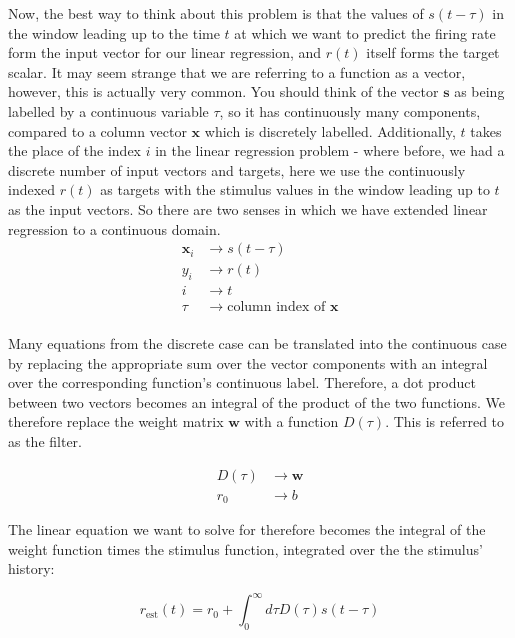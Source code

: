 \documentclass{article}
\begin{document}
Now, the best way to think about this problem is that the values of $s(t-\tau)$ in the window leading up to the time $t$ at which we want to predict the firing rate form the input vector for our linear regression, and $r(t)$ itself forms the target scalar. It may seem strange that we are referring to a function as a vector, however, this is actually very common. You should think of the vector $\bm{s}$ as being labelled by a continuous variable $\tau$, so it has continuously many components, compared to a column vector $\bm{x}$ which is discretely labelled. Additionally, $t$ takes the place of the index $i$ in the linear regression problem - where before, we had a discrete number of input vectors and targets, here we use the continuously indexed $r(t)$ as targets with the stimulus values in the window leading up to $t$ as the input vectors. So there are two senses in which we have extended linear regression to a continuous domain.\\

\begin{align*}
    \bm{x}_i &\rightarrow s(t-\tau)\\
    y_i &\rightarrow r(t)\\
    i &\rightarrow t\\
    \tau &\rightarrow \text{column index of } \bm{x}\\
\end{align*}

Many equations from the discrete case can be translated into the continuous case by replacing the appropriate sum over the vector components with an integral over the corresponding function's continuous label. Therefore, a dot product between two vectors becomes an integral of the product of the two functions. We therefore replace the weight matrix $\bm{w}$ with a function $D(\tau)$. This is referred to as the filter.

\begin{align*}
    D(\tau) &\rightarrow \bm{w}\\
    r_0 &\rightarrow b
\end{align*}

The linear equation we want to solve for therefore becomes the integral of the weight function times the stimulus function, integrated over the the stimulus' history:

\begin{equation*}
    r_{\text{est}}(t) = r_0 + \int_0^\infty d\tau D(\tau)s(t-\tau)
\end{equation*}
\end{document}
